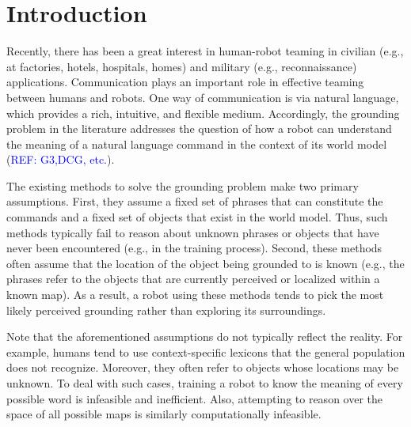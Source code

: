 \section{Introduction}
Recently, there has been a great interest in human-robot teaming in civilian (e.g., at factories, hotels, hospitals, homes) and military (e.g., reconnaissance) applications. Communication plays an important role in effective teaming between humans and robots. One way of communication is via natural language, which provides a rich, intuitive, and flexible medium. Accordingly, the grounding problem in the literature addresses the question of how a robot can understand the meaning of a natural language command in the context of its world model (\textcolor{blue}{REF: G3,DCG, etc.}). 

The existing methods to solve the grounding problem make two primary assumptions. First, they assume a fixed set of phrases that can constitute the commands and a fixed set of objects that exist in the world model. Thus, such methods typically fail to reason about unknown phrases or objects that have never been encountered (e.g., in the training process).
Second, these methods often assume that the location of the object being grounded to is known (e.g., the phrases refer to the objects that are currently perceived or localized within a known map).
As a result, a robot using these methods tends to pick the most likely perceived grounding rather than exploring its surroundings.

Note that the aforementioned assumptions do not typically reflect the reality. For example, humans tend to use context-specific lexicons that the general population does not recognize. Moreover, they often refer to objects whose locations may be unknown. To deal with such cases, training a robot to know the meaning of every possible word is infeasible and inefficient. Also, attempting to reason over the space of all possible maps is similarly computationally infeasible.


